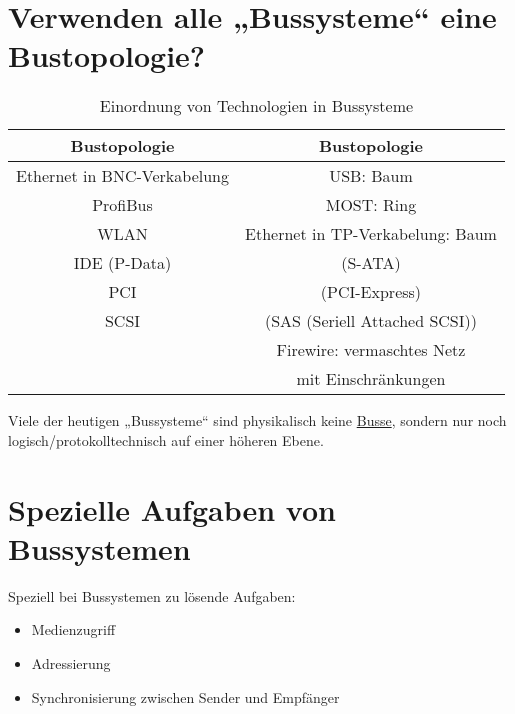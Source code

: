 \section{Verwenden alle „Bussysteme“ eine Bustopologie?}
\begin{table}[h]
\centering
\begin{tabular}{c|c}
\textbf{Bustopologie} & \textbf{Bustopologie} \\ 
\hline 
Ethernet in BNC-Verkabelung & USB: Baum \\ 
\hline 
ProfiBus & MOST: Ring \\ 
\hline 
WLAN & Ethernet in TP-Verkabelung: Baum \\ 
\hline
IDE (P-Data) & (S-ATA)\\
\hline
PCI & (PCI-Express)\\
\hline
SCSI & (SAS (Seriell Attached SCSI))\\
\hline
 & Firewire: vermaschtes Netz\\
 & mit Einschränkungen
\end{tabular}
\caption{Einordnung von Technologien in Bussysteme}
\label{tab:bussystem_or_not}
\end{table} 
Viele der heutigen „Bussysteme“ sind physikalisch keine \underline{Busse}, sondern nur noch logisch/protokolltechnisch auf einer höheren Ebene.



\section{Spezielle Aufgaben von Bussystemen}
\label{sec:spezielle_Aufgaben_Bussysteme}
Speziell bei Bussystemen zu lösende Aufgaben:
\begin{itemize}
\item Medienzugriff
\item Adressierung
\item Synchronisierung zwischen Sender und Empfänger
\end{itemize}


